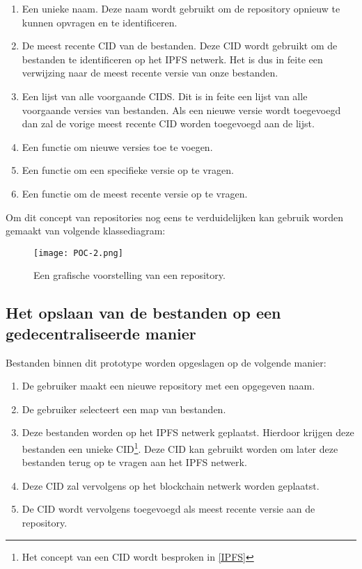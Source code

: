 \begin{enumerate}
\item Een unieke naam. Deze naam wordt gebruikt om de repository opnieuw te kunnen opvragen en te identificeren.
\item De meest recente CID van de bestanden. Deze CID wordt gebruikt om de bestanden te identificeren op het IPFS netwerk. Het is dus in feite een verwijzing naar de meest recente versie van onze bestanden.
\item Een lijst van alle voorgaande CIDS. Dit is in feite een lijst van alle voorgaande versies van bestanden. Als een nieuwe versie wordt toegevoegd dan zal de vorige meest recente CID worden toegevoegd aan de lijst.
\item Een functie om nieuwe versies toe te voegen.
\item Een functie om een specifieke versie op te vragen.
\item Een functie om de meest recente versie op te vragen.
\end{enumerate}

Om dit concept van repositories nog eens te verduidelijken kan gebruik worden gemaakt van volgende klassediagram:

\begin{figure}[h!]
\centering
\texttt{[image: POC-2.png]}
\caption[POC Repository]{Een grafische voorstelling van een repository.}
\end{figure}


\subsection{Het opslaan van de bestanden op een gedecentraliseerde manier}
Bestanden binnen dit prototype worden opgeslagen op de volgende manier:

\begin{enumerate}
\item De gebruiker maakt een nieuwe repository met een opgegeven naam.
\item De gebruiker selecteert een map van bestanden.
\item Deze bestanden worden op het IPFS netwerk geplaatst. Hierdoor krijgen deze bestanden een unieke CID\footnote{Het concept van een CID wordt besproken in \ref{IPFS}}. Deze CID kan gebruikt worden om later deze bestanden terug op te vragen aan het IPFS netwerk.
\item Deze CID zal vervolgens op het blockchain netwerk worden geplaatst.
\item De CID wordt vervolgens toegevoegd als meest recente versie aan de repository.
\end{enumerate}

